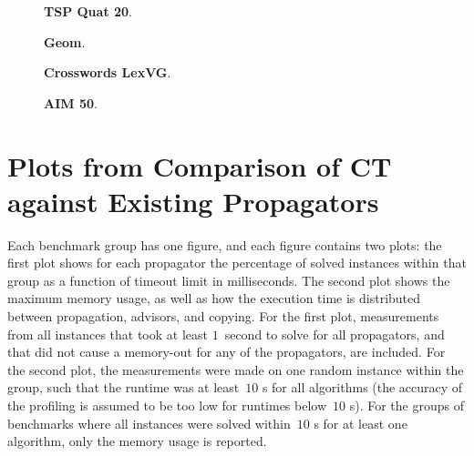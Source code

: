 \documentclass[a4paper,11pt]{article}
\theoremstyle{definition}
\numberwithin{equation}{section}
\begin{document}
\begin{figure}
  \begin{minipage}[b][8cm][s]{0.45\textwidth}
    \centering
    \vfill
    \begin{tikzpicture}[scale=0.9]
      
    \end{tikzpicture}
    \vfill
    \caption{\textbf{TSP Quat 20}.}
    \vspace{\baselineskip}
  \end{minipage}\qquad
  \begin{minipage}[b][8cm][s]{0.45\textwidth}
    \centering
    \vfill
    \begin{tikzpicture}[scale=0.9]
      
    \end{tikzpicture}
    \vfill
    \caption{\textbf{Geom}.}
    \vspace{\baselineskip}
  \end{minipage}\qquad
  \begin{minipage}[b][8cm][s]{0.45\textwidth}
    \centering
    \vfill
    \begin{tikzpicture}[scale=0.9]
      
    \end{tikzpicture}
    \vfill
    \caption{\textbf{Crosswords LexVG}.}
    \vspace{\baselineskip}
  \end{minipage} \qquad
    \begin{minipage}[b][8cm][s]{0.45\textwidth}
    \centering
    \vfill
    \begin{tikzpicture}[scale=0.9]
      
    \end{tikzpicture}
    \vfill
    \caption{\textbf{AIM 50}.}
    \vspace{\baselineskip}
  \end{minipage} \qquad

\end{figure}

\clearpage

\section{Plots from Comparison of CT against Existing Propagators}
\label{app:compare-gecode}

Each benchmark group has one figure, and each figure contains two plots:
the first plot shows for each propagator the percentage of solved instances within that group
as a function of timeout limit in milliseconds.
The second plot shows the maximum memory usage, as well as how the execution time is
distributed between propagation,
advisors, and copying.
For the first plot, measurements from all instances that took at least $1$~second to solve for all
propagators, and that did not cause a memory-out for any of the propagators, are included.
For the second plot, the measurements were made on one random instance within the group, such
that the runtime was at least~$10$ s for all algorithms (the accuracy of the profiling is assumed
to be too low for runtimes below~$10$ s).
For the groups of benchmarks where all instances were solved within~$10$ s for at least one algorithm,
only the memory usage is reported.
\end{document}
